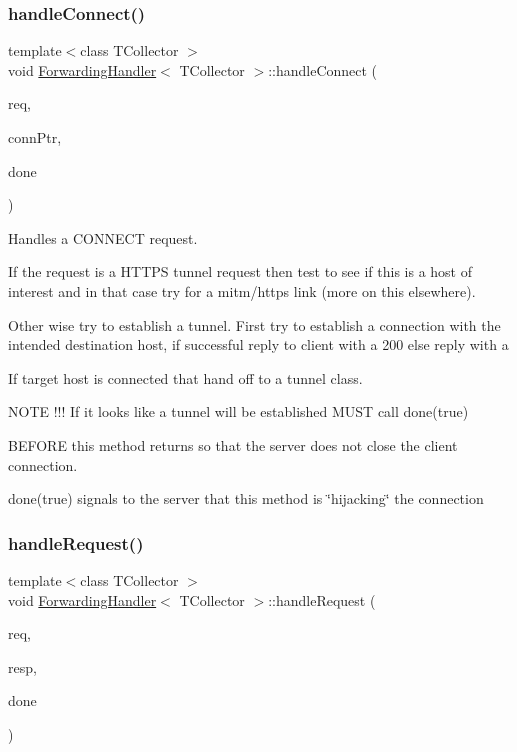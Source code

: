 \subsubsection{\texorpdfstring{handle\+Connect()}{handleConnect()}}
{\footnotesize\ttfamily template$<$class T\+Collector $>$ \\
void \hyperlink{class_forwarding_handler}{Forwarding\+Handler}$<$ T\+Collector $>$\+::handle\+Connect (\begin{DoxyParamCaption}\item[{Message\+Reader\+S\+Ptr}]{req,  }\item[{Connection\+Interface\+S\+Ptr}]{conn\+Ptr,  }\item[{Handler\+Done\+Callback\+Type}]{done }\end{DoxyParamCaption})}

Handles a C\+O\+N\+N\+E\+CT request.

If the request is a H\+T\+T\+PS tunnel request then test to see if this is a host of interest and in that case try for a mitm/https link (more on this elsewhere).

Other wise try to establish a tunnel. First try to establish a connection with the intended destination host, if successful reply to client with a 200 else reply with a
\begin{DoxyEnumerate}
\item If target host is connected that hand off to a tunnel class.
\end{DoxyEnumerate}

N\+O\+TE !!! If it looks like a tunnel will be established M\+U\+ST call done(true)

B\+E\+F\+O\+RE this method returns so that the server does not close the client connection.

done(true) signals to the server that this method is \char`\"{}hijacking\char`\"{} the connection \mbox{\label{class_forwarding_handler_ab5007f621c7f0fe5a9c92b71ff6c15ef}} 
\subsubsection{\texorpdfstring{handle\+Request()}{handleRequest()}}
{\footnotesize\ttfamily template$<$class T\+Collector $>$ \\
void \hyperlink{class_forwarding_handler}{Forwarding\+Handler}$<$ T\+Collector $>$\+::handle\+Request (\begin{DoxyParamCaption}\item[{Message\+Reader\+S\+Ptr}]{req,  }\item[{Message\+Writer\+S\+Ptr}]{resp,  }\item[{Handler\+Done\+Callback\+Type}]{done }\end{DoxyParamCaption})}

